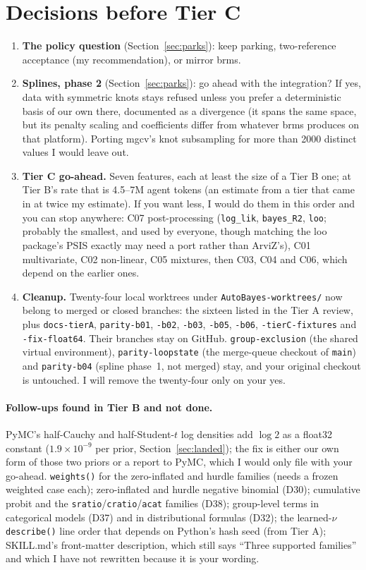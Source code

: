 \documentclass[11pt]{article}
\newcommand{\code}[1]{\texttt{#1}}
\newcommand{\file}[1]{\texttt{#1}}
\begin{document}
\section{Decisions before Tier C}
\label{sec:decisions}

\begin{enumerate}
\item \textbf{The policy question} (Section~\ref{sec:parks}): keep parking, two-reference acceptance (my
  recommendation), or mirror brms.
\item \textbf{Splines, phase 2} (Section~\ref{sec:parks}): go ahead with the integration? If yes, data with
  symmetric knots stays refused unless you prefer a deterministic basis of our own there, documented as a divergence
  (it spans the same space, but its penalty scaling and coefficients differ from whatever brms produces on that
  platform). Porting mgcv's knot subsampling for more than 2000 distinct values I would leave out.
\item \textbf{Tier C go-ahead.} Seven features, each at least the size of a Tier B one; at Tier B's rate that is 4.5--7M agent
  tokens (an estimate from a tier that came in at twice my estimate). If you want less, I would do them in this
  order and you can stop anywhere: C07 post-processing (\code{log\_lik}, \code{bayes\_R2}, \code{loo}; probably the smallest, and
  used by everyone, though matching the loo package's PSIS exactly may need a port rather than ArviZ's), C01 multivariate, C02 non-linear, C05 mixtures, then C03, C04 and C06, which depend on the earlier ones.
\item \textbf{Cleanup.} Twenty-four local worktrees under \file{AutoBayes-worktrees/} now belong to merged or
  closed branches: the sixteen listed in the Tier A review, plus \file{docs-tierA}, \file{parity-b01}, \file{-b02},
  \file{-b03}, \file{-b05}, \file{-b06}, \file{-tierC-fixtures} and \file{-fix-float64}. Their branches stay on
  GitHub. \file{group-exclusion} (the shared virtual environment), \file{parity-loopstate} (the merge-queue checkout
  of \code{main}) and \file{parity-b04} (spline phase~1, not merged) stay, and your original checkout is untouched. I
  will remove the twenty-four only on your yes.
\end{enumerate}

\paragraph{Follow-ups found in Tier B and not done.} PyMC's half-Cauchy and half-Student-$t$ log densities add
$\log 2$ as a float32 constant ($1.9\times10^{-9}$ per prior, Section~\ref{sec:landed}); the fix is either our own
form of those two priors or a report to PyMC, which I would only file with your go-ahead. \code{weights()} for the zero-inflated and hurdle families (needs
a frozen weighted case each); zero-inflated and hurdle negative binomial (D30); cumulative probit and the
\code{sratio}/\code{cratio}/\code{acat} families (D38); group-level terms in categorical models (D37) and in
distributional formulas (D32); the learned-$\nu$ \code{describe()} line order that depends on Python's hash seed
(from Tier A); SKILL.md's front-matter description, which still says ``Three supported families'' and which I have not
rewritten because it is your wording.
\end{document}
